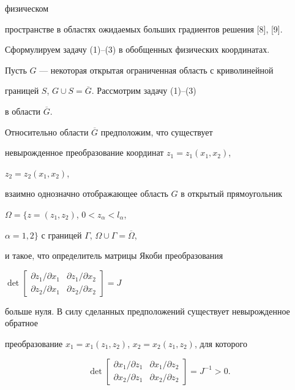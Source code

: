 физическом


пространстве в областях ожидаемых больших градиентов решения [8], [9].


Сформулируем задачу (1)--(3) в обобщенных физических координатах.


Пусть $G$ --- некоторая открытая ограниченная область с криволинейной


границей $S$, $G\cup S=\overline G$. Рассмотрим задачу (1)--(3)


в области $\overline G$.


Относительно области $\overline G$ предположим, что существует


невырожденное преобразование координат $z_1=z_1(x_1,x_2)$,


$z_2=z_2(x_1,x_2)$,


взаимно однозначно отображающее область $G$ в открытый прямоугольник


$\Omega=\{z=(z_1,z_2)$, $0<z_\alpha<l_\alpha$,


$\alpha=1,2\}$ с границей $\Gamma$, $\Omega\cup\Gamma=\overline\Omega$,


и такое, что определитель матрицы Якоби преобразования


$\det\left[\begin{smallmatrix}


\partial z_1/\partial x_1 & \partial z_1/\partial x_2 \\


\partial z_2/\partial x_1 & \partial z_2/\partial x_2


\end{smallmatrix}\right]=J$


больше нуля. В силу сделанных предположений существует невырожденное обратное


преобразование $x_1=x_1(z_1,z_2)$, $x_2=x_2(z_1,z_2)$, для которого


\begin{equation}


\det


\begin{bmatrix}


\partial x_1/\partial z_1 & \partial x_1/\partial z_2 \\


\partial x_2/\partial z_1 & \partial x_2/\partial z_2


\end{bmatrix}


=J^{-1}>0.


\end{equation}


